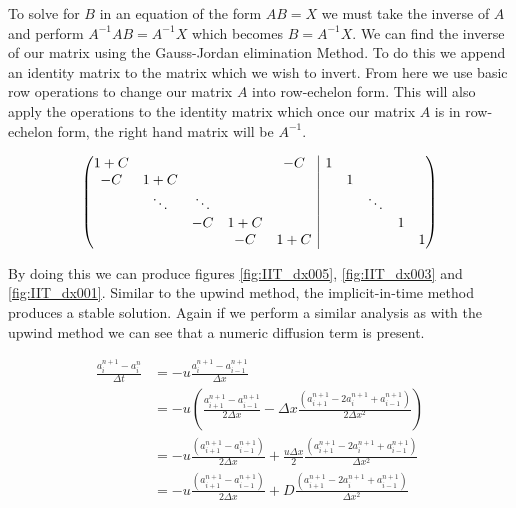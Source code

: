 To solve for $B$ in an equation of the form $AB = X$  we must take the inverse of $A$ and perform $A^{-1}AB = A^{-1}X$ which becomes $B = A^{-1}X$. We can find the inverse of our matrix using the Gauss-Jordan elimination Method. To do this we append an identity matrix to the matrix which we wish to invert. From here we use basic row operations to change our matrix $A$ into row-echelon form. This will also apply the operations to the identity matrix which once our matrix $A$ is in row-echelon form, the right hand matrix will be $A^{-1}$.

\begin{equation*}
\left(
\begin{array}{@{}ccccc|ccccc@{}}
1+C &        &        &     & -C  & 1 &   &        &   &   \\
-C  & 1+C    &        &     &     &   & 1 &        &   &   \\
    & \ddots & \ddots &     &     &   &   & \ddots &   &   \\
    &        & -C     & 1+C &     &   &   &        & 1 &   \\    
    &        &        & -C  & 1+C &   &   &        &   & 1 \\    
\end{array}
\right)
\end{equation*}

By doing this we can produce figures \ref{fig:IIT_dx005}, \ref{fig:IIT_dx003} and \ref{fig:IIT_dx001}. Similar to the upwind method, the implicit-in-time method produces a stable solution. Again if we perform a similar analysis as with the upwind method we can see that a numeric diffusion term is present. 

\begin{equation}
\begin{split}
     \frac{a_i^{n+1} - a_i^n}{\Delta t} &= -u \frac{a_i^{n+1} - a_{i-1}^{n+1}}{\Delta x} \\
                                        &= -u \left(\frac{a_{i+1}^{n+1} - a_{i-1}^{n+1}}{2\Delta x} - \Delta x \frac{(a_{i+1}^{n+1} - 2a_i^{n+1} + a_{i-1}^{n+1})}{2\Delta x^2} \right) \\
                                        &= -u \frac{(a_{i+1}^{n+1}- a_{i-1}^{n+1})}{2\Delta x} + \frac{u \Delta x}{2} \frac{(a_{i+1}^{n+1} - 2a_i^{n+1} + a_{i-1}^{n+1})}{\Delta x^2} \\
                                        &= -u \frac{(a_{i+1}^{n+1} - a_{i-1}^{n+1})}{2\Delta x} + D \frac{(a_{i+1}^{n+1} - 2a_i^{n+1} + a_{i-1}^{n+1})}{\Delta x^2} 
\end{split}
\label{eq:IIT_diff}
\end{equation}

